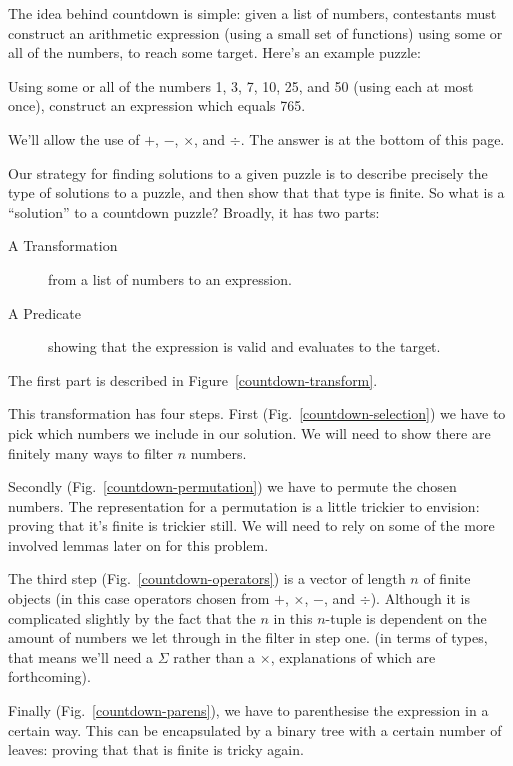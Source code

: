 The idea behind countdown is simple: given a list of numbers, contestants must
construct an arithmetic expression (using a small set of functions) using some
or all of the numbers, to reach some target.
Here's an example puzzle:
\begin{displayquote}
  Using some or all of the numbers 1, 3, 7, 10, 25, and 50 (using each at most
  once), construct an expression which equals 765.
\end{displayquote}
We'll allow the use of \(+\), \(-\), \(\times\), and \(\div\).
The answer is at the bottom of this page\footnotemark.


Our strategy for finding solutions to a given puzzle is to describe precisely
the type of solutions to a puzzle, and then show that that type is finite.
So what is a ``solution'' to a countdown puzzle?
Broadly, it has two parts:
\begin{description}
  \item[A Transformation] from a list of numbers to an expression.
  \item[A Predicate] showing that the expression is valid and evaluates to the
    target.
\end{description}
The first part is described in Figure~\ref{countdown-transform}.


This transformation has four steps.
First (Fig.~\ref{countdown-selection}) we have to pick which numbers we include
in our solution.
We will need to show there are finitely many ways to filter \(n\) numbers.

Secondly (Fig.~\ref{countdown-permutation}) we have to permute the chosen
numbers.
The representation for a permutation is a little trickier to envision: proving
that it's finite is trickier still.
We will need to rely on some of the more involved lemmas later on for this
problem.

The third step (Fig.~\ref{countdown-operators}) is a vector of length \(n\) of finite objects (in this case operators
chosen from \(+\), \(\times\), \(-\), and \(\div\)).
Although it is complicated slightly by the fact that the \(n\) in this
\(n\)-tuple is dependent on the amount of numbers we let through in the filter
in step one.
(in terms of types, that means we'll need a \(\Sigma\) rather than a
\(\times\), explanations of which are forthcoming).

Finally (Fig.~\ref{countdown-parens}), we have to parenthesise the expression in
a certain way.
This can be encapsulated by a binary tree with a certain number of leaves:
proving that that is finite is tricky again.

